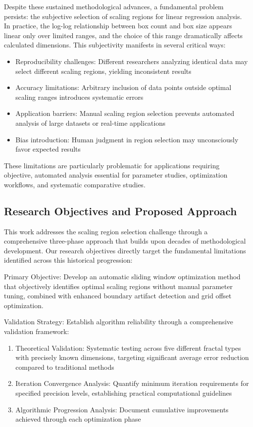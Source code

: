 \documentclass[preprint,12pt]{elsarticle}
\def\textbf#1{#1}%
\begin{document}
Despite these sustained methodological advances, a fundamental problem persists: the subjective selection of scaling regions for linear regression analysis. In practice, the log-log relationship between box count and box size appears linear only over limited ranges, and the choice of this range dramatically affects calculated dimensions. This subjectivity manifests in several critical ways:

\begin{itemize}
\item \textbf{Reproducibility challenges}: Different researchers analyzing identical data may select different scaling regions, yielding inconsistent results
\item \textbf{Accuracy limitations}: Arbitrary inclusion of data points outside optimal scaling ranges introduces systematic errors
\item \textbf{Application barriers}: Manual scaling region selection prevents automated analysis of large datasets or real-time applications
\item \textbf{Bias introduction}: Human judgment in region selection may unconsciously favor expected results
\end{itemize}

These limitations are particularly problematic for applications requiring objective, automated analysis essential for parameter studies, optimization workflows, and systematic comparative studies.

\subsection{Research Objectives and Proposed Approach}

This work addresses the scaling region selection challenge through a comprehensive three-phase approach that builds upon decades of methodological development. Our research objectives directly target the fundamental limitations identified across this historical progression:

\textbf{Primary Objective}: Develop an automatic sliding window optimization method that objectively identifies optimal scaling regions without manual parameter tuning, combined with enhanced boundary artifact detection and grid offset optimization.

\textbf{Validation Strategy}: Establish algorithm reliability through a comprehensive validation framework:

\begin{enumerate}
\item \textbf{Theoretical Validation}: Systematic testing across five different fractal types with precisely known dimensions, targeting significant average error reduction compared to traditional methods

\item \textbf{Iteration Convergence Analysis}: Quantify minimum iteration requirements for specified precision levels, establishing practical computational guidelines

\item \textbf{Algorithmic Progression Analysis}: Document cumulative improvements achieved through each optimization phase
\end{enumerate}
\end{document}
